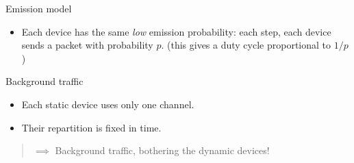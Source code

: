 \begin{frameO}[Hypotheses ($1/2$)]

    \begin{colorblock}{Emission model}

        \begin{itemize}\tightlist
            \item
                  Each device has the same \emph{low} emission probability: \newline
                  each step, each device sends a packet with probability \(p\).
                  \newline
                  \hfill{}\small{(this gives a duty cycle proportional to $1/p$)}
        \end{itemize}

    \end{colorblock}

    \begin{colorblock}{Background traffic}

        \begin{itemize}\tightlist
            \item
                  Each static device uses only one channel.
            \item
                  Their repartition is fixed in time.
        \end{itemize}

    \end{colorblock}

    \begin{quote}
        \(\implies\) Background traffic, bothering the dynamic devices!
    \end{quote}

\end{frameO}

